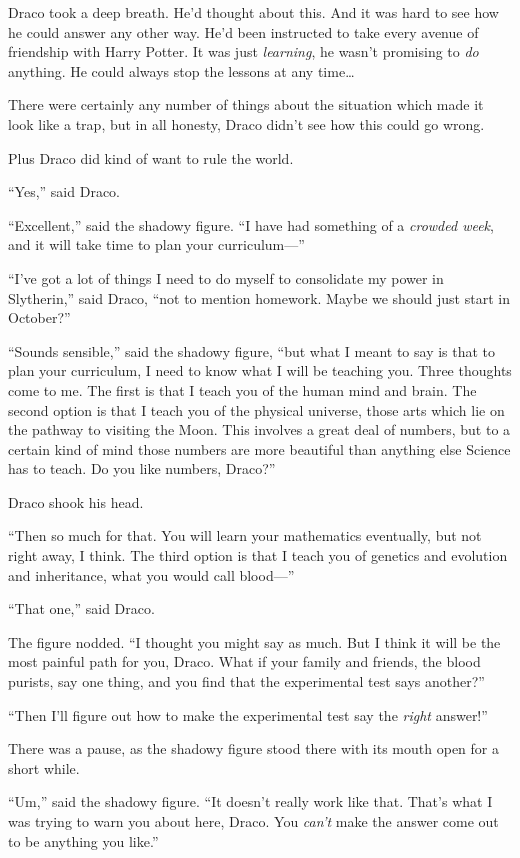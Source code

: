 Draco took a deep breath. He’d thought about this. And it was hard to see how he could answer any other way. He’d been instructed to take every avenue of friendship with Harry Potter. It was just \emph{learning}, he wasn’t promising to \emph{do} anything. He could always stop the lessons at any time…

There were certainly any number of things about the situation which made it look like a trap, but in all honesty, Draco didn’t see how this could go wrong.

Plus Draco did kind of want to rule the world.

“Yes,” said Draco.

“Excellent,” said the shadowy figure. “I have had something of a \emph{crowded week}, and it will take time to plan your curriculum—”

“I’ve got a lot of things I need to do myself to consolidate my power in Slytherin,” said Draco, “not to mention homework. Maybe we should just start in October?”

“Sounds sensible,” said the shadowy figure, “but what I meant to say is that to plan your curriculum, I need to know what I will be teaching you. Three thoughts come to me. The first is that I teach you of the human mind and brain. The second option is that I teach you of the physical universe, those arts which lie on the pathway to visiting the Moon. This involves a great deal of numbers, but to a certain kind of mind those numbers are more beautiful than anything else Science has to teach. Do you like numbers, Draco?”

Draco shook his head.

“Then so much for that. You will learn your mathematics eventually, but not right away, I think. The third option is that I teach you of genetics and evolution and inheritance, what you would call blood—”

“That one,” said Draco.

The figure nodded. “I thought you might say as much. But I think it will be the most painful path for you, Draco. What if your family and friends, the blood purists, say one thing, and you find that the experimental test says another?”

“Then I’ll figure out how to make the experimental test say the \emph{right} answer!”

There was a pause, as the shadowy figure stood there with its mouth open for a short while.

“Um,” said the shadowy figure. “It doesn’t really work like that. That’s what I was trying to warn you about here, Draco. You \emph{can’t} make the answer come out to be anything you like.”

